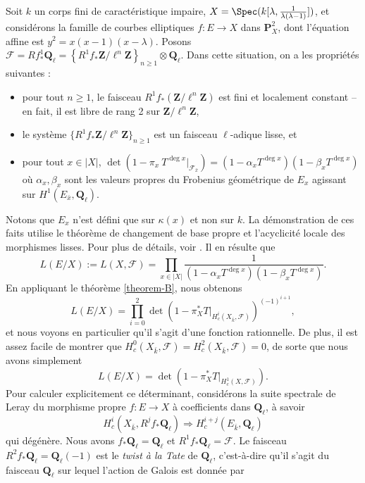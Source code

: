 \noindent
Soit $k$ un corps fini de caractéristique impaire,
$X = \Spec(k[\lambda, \frac{1}{\lambda(\lambda - 1)}])$, et
considérons la famille de courbes elliptiques
$f : E \to X$ dans $\mathbf{P}^2_X$, dont l'équation affine est $y^2 =
x(x - 1)(x - \lambda)$. Posons $\mathcal{F} = Rf_*^1\mathbf{Q}_\ell =
\left\{R^1f_*\mathbf{Z}/\ell^n\mathbf{Z}\right\}_{n\geq 1} \otimes
\mathbf{Q}_\ell$. Dans cette situation, on a les propriétés suivantes :
\begin{itemize}
\item pour tout $n \geq 1$, le faisceau $R^1f_*(\mathbf{Z}/\ell^n\mathbf{Z})$ est
fini et localement constant -- en fait, il est libre de rang 2 sur
$\mathbf{Z}/\ell^n\mathbf{Z}$,
\item le système $\{R^1f_*\mathbf{Z}/\ell^n\mathbf{Z}\}_{n\geq 1}$ est un faisceau
$\ell$-adique lisse, et
\item pour tout $x\in |X|$,
$\det(1 - \pi_x\ T^{\deg x} |_{\mathcal{F}_{\bar x}}) =
(1 - \alpha_x T^{\deg x})(1 - \beta_x T^{\deg x})$
où $\alpha_x, \beta_x$ sont les valeurs propres du Frobenius géométrique
de $E_x$ agissant sur $H^1(E_{\bar x}, \mathbf{Q}_\ell)$.
\end{itemize}
Notons que $E_x$ n'est défini que sur $\kappa(x)$ et non sur $k$. La démonstration de
ces faits utilise le théorème de changement de base propre et l'acyclicité locale des
morphismes lisses. Pour plus de détails, voir \cite{SGA4.5}. Il en résulte que
$$
L(E/X) := L(X, \mathcal{F}) = \prod_{x\in |X|}
\frac{1}{(1-\alpha_xT^{\deg x})(1-\beta_xT^{\deg x })} .
$$
En appliquant le théorème \ref{theorem-B}, nous obtenons
$$
L(E/X) =
\prod_{i = 0}^2
\det\left(1 - \pi_X^*T |_{H_c^i(X_{\bar k}, \mathcal{F})}\right)^{(-1)^{i+1}},
$$
et nous voyons en particulier qu'il s'agit d'une fonction rationnelle. De plus, il est
assez facile de montrer que $H_c^0(X_{\bar k}, \mathcal{F}) = H_c^2(X_{\bar
k}, \mathcal{F}) = 0$, de sorte que nous avons simplement
$$
L(E/X) = \det(1 - \pi_X^*T |_{H_c^1(X, \mathcal{F})}).
$$
Pour calculer explicitement ce déterminant, considérons la suite spectrale de Leray
du morphisme propre $f : E \to X$ à coefficients dans $\mathbf{Q}_\ell$, à savoir
$$
H_c^i(X_{\bar k}, R^jf_*\mathbf{Q}_\ell) \Rightarrow H_c^{i+j}(E_{\bar
k}, \mathbf{Q}_\ell)
$$
qui dégénère. Nous avons $f_*\mathbf{Q}_\ell = \mathbf{Q}_\ell$ et
$R^1f_*\mathbf{Q}_\ell = \mathcal{F}$. Le faisceau $R^2f_*\mathbf{Q}_\ell =
\mathbf{Q}_\ell(-1)$ est le {\it twist à la Tate} de $\mathbf{Q}_\ell$, c'est-à-dire
qu'il s'agit du faisceau $\mathbf{Q}_\ell$ sur lequel l'action de Galois est donnée par
